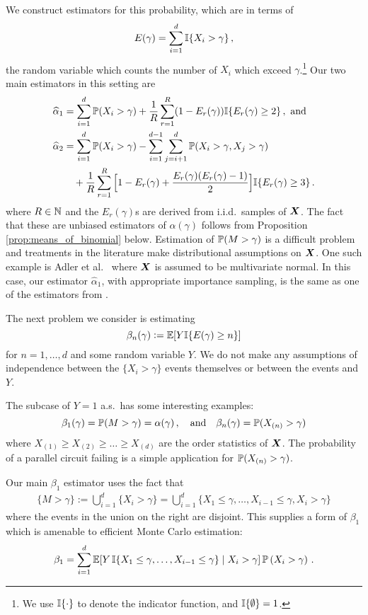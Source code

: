 We construct estimators for this probability, which are in terms of 
\[ E(\gamma) = \sum_{i=1}^d \mathbb I\{X_i > \gamma\} \,,\]
the random variable which counts the number of $X_i$ which exceed $\gamma$.\footnote{We use $\mathbb I\{ \cdot \}$ to denote the indicator function, and $\mathbb I\{ \emptyset \} = 1$.} Our two main estimators in this setting are %
\begin{align} 
  \widehat{\alpha}_1 \label{alpha_1}
  &= \sum_{i=1}^d \operatorname{{\mathbb P}}(X_i > \gamma) + \frac1R \sum_{r=1}^R (1 - E_r(\gamma)) \mathbb I\{E_r(\gamma) \ge 2 \} \,, \text{ and} \\
  \widehat{\alpha}_2  \label{alpha_2}
  &= \sum_{i=1}^d \operatorname{{\mathbb P}}(X_i > \gamma) - \sum_{i=1}^{d-1} \sum_{j=i+1}^d \operatorname{{\mathbb P}}(X_i > \gamma, X_j > \gamma) \\
  &\quad + \frac1R \sum_{r=1}^R \Big[1 - E_r(\gamma) + \frac{E_r(\gamma) (E_r(\gamma) -1)}{2} \Big] \mathbb I\{E_r(\gamma) \ge 3\} \,. \notag
\end{align}
where $R \in {\mathbb N}$ and the $E_r(\gamma)$s are derived from i.i.d.\ samples of $\bm{X}$.
The fact that these are unbiased estimators of $\alpha(\gamma)$ follows from
Proposition \ref{prop:means_of_binomial} below. Estimation of 
$\operatorname{{\mathbb P}}(M > \gamma)$ is a difficult problem and treatments in the literature make distributional assumptions on $\bm{X}$. 
 One such example is Adler et al.\ \cite{adler2012efficient} where $\bm{X}$ is assumed to be multivariate normal. In this case, our estimator $\hat{\alpha}_1$, with appropriate importance sampling, is the same as one of the estimators from \cite{adler2012efficient}.
 
The next problem we consider is estimating
\[ \beta_n(\gamma) := \operatorname{{\mathbb E}}[ Y \mathbb I\{ E(\gamma) \ge n\} ] \]
for $n=1,\dots,d$ and some random variable $Y$.
We do not make any assumptions of independence between the $\{X_i > \gamma\}$ events themselves or between the events and $Y$.

The subcase of $Y=1$ a.s.\ has some interesting examples:
\[ \beta_1(\gamma) = \operatorname{{\mathbb P}}(M > \gamma) = \alpha(\gamma) \,, \quad \text{and} \quad 
 \beta_n(\gamma) = \operatorname{{\mathbb P}}(X_{(n)} > \gamma) \]
where $X_{(1)} \ge X_{(2)} \ge \dots \ge X_{(d)}$ are the order statistics of $\bm{X}$. The probability of a parallel circuit failing is a simple application for $\operatorname{{\mathbb P}}(X_{(n)} > \gamma)$. 

Our main $\beta_1$ estimator uses the fact that
\begin{align} \label{extreme-first-partition}
\{M > \gamma\}  := \bigcup_{i=1}^d \{X_i > \gamma\} = \bigcup_{i=1}^d \{X_1 \le \gamma, \dots, X_{i-1} \le \gamma, X_i > \gamma\}
\end{align}
where the events in the union on the right are disjoint.
This supplies a form of $\beta_1$ which is amenable to efficient Monte Carlo estimation:
\begin{equation} \label{extreme-beta_1}
 \beta_1=\sum_{i=1}^d \operatorname{{\mathbb E}} [ Y \, \mathbb I\{X_1 \le \gamma, \dots, X_{i-1} \le \gamma \} \mid X_i > \gamma ] \operatorname{{\mathbb P}}\left(X_i > \gamma \right) \,.
\end{equation}

